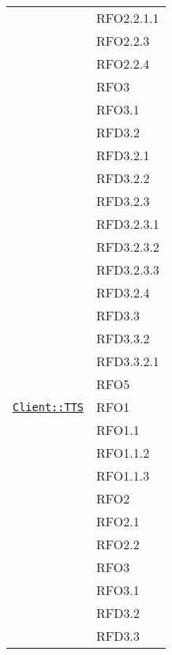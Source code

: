 \begin{longtable}{|>{\centering}m{10cm}|m{3cm}<{\centering}|}
& RFO2.2.1.1\\
& RFO2.2.3\\
& RFO2.2.4\\
& RFO3\\
& RFO3.1\\
& RFD3.2\\
& RFD3.2.1\\
& RFD3.2.2\\
& RFD3.2.3\\
& RFD3.2.3.1\\
& RFD3.2.3.2\\
& RFD3.2.3.3\\
& RFD3.2.4\\
& RFD3.3\\
& RFD3.3.2\\
& RFD3.3.2.1\\
& RFO5\\ \hline

\hyperref[Client::TTS]{\texttt{Client::TTS}} & RFO1\\
& RFO1.1\\
& RFO1.1.2\\
& RFO1.1.3\\
& RFO2\\
& RFO2.1\\
& RFO2.2\\
& RFO3\\
& RFO3.1\\
& RFD3.2\\
& RFD3.3\\ \hline


\end{longtable}
